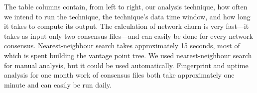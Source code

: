 The table columns contain, from left to right, our analysis technique, how often
we intend to run the technique, the technique's data time window, and how long
it takes to compute its output.  The calculation of network churn is very
fast---it takes as input only two consensus files---and can easily be done for
every network consensus.  Nearest-neighbour search takes approximately 15
seconds, most of which is spent building the vantage point tree.  We used
nearest-neighbour search for manual analysis, but it could be used
automatically.  Fingerprint and uptime analysis for one month work of consensus
files both take approximately one minute and can easily be run daily.
